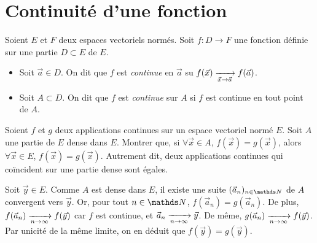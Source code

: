 \section{Continuité d'une fonction}

\begin{defn}
	Soient $E$\/ et $F$\/ deux espaces vectoriels normés. Soit $f : D \to F$\/ une fonction définie sur une partie $D \subset E$ de $E$.
	\begin{itemize}
		\item Soit $\vec{a} \in D$. On dit que $f$\/ est \textit{continue} en $\vec{a}$\/ su $f(\vec{x})\xrightarrow[\vec{x} \to \vec{a}]{} f(\vec{a})$.
		\item Soit $A \subset D$. On dit que $f$\/ est \textit{continue} sur $A$\/ si $f$\/ est continue en tout point de $A$.
	\end{itemize}
\end{defn}


\begin{exo}
	\begin{slshape}
		Soient $f$\/ et $g$\/ deux applications continues sur un espace vectoriel normé $E$. Soit $A$\/ une partie de $E$\/ dense dans $E$. Montrer que, si $\forall \vec{x} \in A$, $f(\vec{x}) = g(\vec{x})$, alors $\forall \vec{x} \in E$, $f(\vec{x}) = g(\vec{x})$.
		Autrement dit, deux applications continues qui coïncident sur une partie dense sont égales.
	\end{slshape}

	Soit $\vec{y} \in E$. Comme $A$\/ est dense dans $E$, il existe une suite $(\vec{a}_n)_{n\in\N}$\/ de $A$\/ convergent vers $\vec{y}$.
	Or, pour tout $n \in \N$, $f(\vec{a}_n) = g(\vec{a}_n)$. De plus, $f(\vec{a}_n) \xrightarrow[n\to \infty]{} f(\vec{y})$\/ car $f$\/ est continue, et $\vec{a}_n\xrightarrow[n\to \infty]{} \vec{y}$.
	De même, $g(\vec{a}_n) \xrightarrow[n\to \infty]{} f(\vec{y})$.
	Par unicité de la même limite, on en déduit que $f(\vec{y}) = g(\vec{y})$.
\end{exo}


